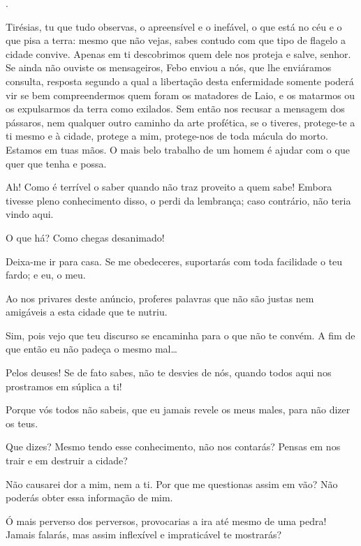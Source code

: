 .

   Tirésias, tu que tudo observas, o apreensível e o inefável, o que
está no céu e o que pisa a terra: mesmo que não vejas, sabes contudo com
que tipo de flagelo a cidade convive. Apenas em ti descobrimos quem dele
nos proteja e salve, senhor. Se ainda não ouviste os mensageiros, Febo
enviou a nós, que lhe enviáramos consulta, resposta segundo a qual a
libertação desta enfermidade somente poderá vir se bem compreendermos
quem foram os matadores de Laio, e os matarmos ou os expulsarmos
da terra como exilados. Sem então nos recusar a mensagem dos pássaros,
nem qualquer outro caminho da arte profética, se o tiveres, protege-te a
ti mesmo e à cidade, protege a mim, protege-nos de toda mácula do morto.
Estamos em tuas mãos. O mais belo trabalho de um homem é ajudar com o
que quer que tenha e possa.

   Ah! Como é terrível o saber quando não traz proveito a quem sabe! Embora
tivesse pleno conhecimento disso, o perdi da lembrança; caso contrário,
não teria vindo aqui.

   O que há? Como chegas desanimado!

   Deixa-me ir para casa. Se me obedeceres, suportarás com toda
facilidade o teu fardo; e eu, o meu.

   Ao nos privares deste anúncio, proferes palavras que não são justas nem
amigáveis a esta cidade que te nutriu.

   Sim, pois vejo que teu discurso se encaminha para o que não te convém. A
fim de que então eu não padeça o mesmo mal\ldots{}

   Pelos deuses! Se de fato sabes, não te desvies de nós, quando todos aqui
nos prostramos em súplica a ti!

   Porque vós todos não sabeis, que eu jamais revele os meus males, para
não dizer os teus.

   Que dizes? Mesmo tendo esse conhecimento, não nos contarás? Pensas
em nos trair e em destruir a cidade?

   Não causarei dor a mim, nem a ti. Por que me questionas assim em vão?
Não poderás obter essa informação de mim.

   Ó mais perverso dos perversos, provocarias a ira até mesmo de uma pedra!
Jamais falarás, mas assim inflexível e impraticável te mostrarás?

